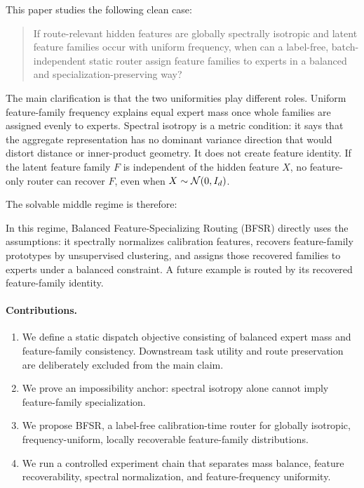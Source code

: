 \documentclass{article}
\begin{document}
This paper studies the following clean case:
\begin{quote}
If route-relevant hidden features are globally spectrally isotropic and latent
feature families occur with uniform frequency, when can a label-free,
batch-independent static router assign feature families to experts in a balanced
and specialization-preserving way?
\end{quote}

The main clarification is that the two uniformities play different roles.
Uniform feature-family frequency explains equal expert mass once whole families
are assigned evenly to experts.  Spectral isotropy is a metric condition: it says
that the aggregate representation has no dominant variance direction that would
distort distance or inner-product geometry.  It does not create feature identity.
If the latent feature family \(F\) is independent of the hidden feature \(X\), no
feature-only router can recover \(F\), even when \(X\sim\mathcal{N}(0,I_d)\).

The solvable middle regime is therefore:
\begin{center}
\end{center}
In this regime, Balanced Feature-Specializing Routing (BFSR) directly uses the
assumptions: it spectrally normalizes calibration features, recovers
feature-family prototypes by unsupervised clustering, and assigns those recovered
families to experts under a balanced constraint.  A future example is routed by
its recovered feature-family identity.

\paragraph{Contributions.}
\begin{enumerate}[leftmargin=*]
    \item We define a static dispatch objective consisting of balanced expert
    mass and feature-family consistency.  Downstream task utility and route
    preservation are deliberately excluded from the main claim.
    \item We prove an impossibility anchor: spectral isotropy alone cannot imply
    feature-family specialization.
    \item We propose BFSR, a label-free calibration-time router for globally
    isotropic, frequency-uniform, locally recoverable feature-family
    distributions.
    \item We run a controlled experiment chain that separates mass balance,
    feature recoverability, spectral normalization, and feature-frequency
    uniformity.
\end{enumerate}
\end{document}
